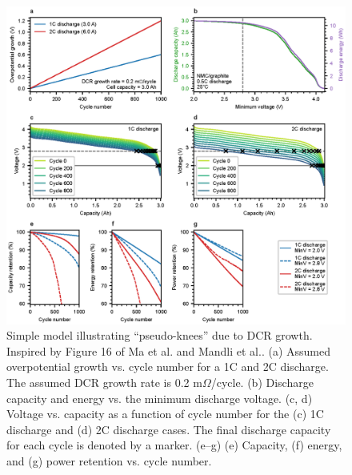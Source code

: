 \documentclass{article}
\begin{document}
\begin{figure}[]
\centering
\includegraphics[scale = 0.9]{figures/dcr_growth_knee_2.eps}
\caption{Simple model illustrating ``pseudo-knees'' due to DCR growth. Inspired by Figure 16 of Ma et al.\cite{ma_editors_2019} and Mandli et al.\cite{mandli_analysis_2019}. (a) Assumed overpotential growth vs. cycle number for a 1C and 2C discharge. The assumed DCR growth rate is 0.2 m$\Omega$/cycle. (b) Discharge capacity and energy vs. the minimum discharge voltage. (c, d) Voltage vs. capacity as a function of cycle number for the (c) 1C discharge and (d) 2C discharge cases. The final discharge capacity for each cycle is denoted by a marker. (e--g) (e) Capacity, (f) energy, and (g) power retention vs. cycle number.
}
\label{fig:dcr_knee}
\end{figure}
\end{document}
